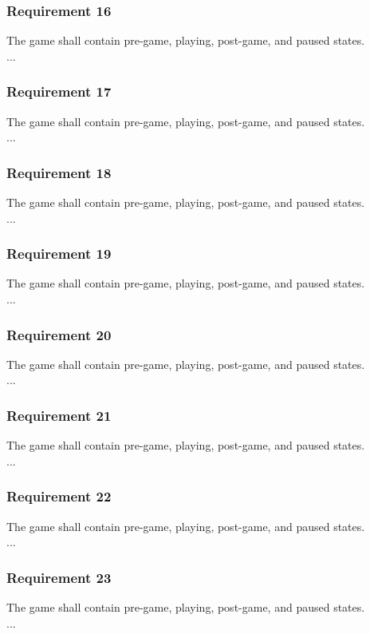 \documentclass[12pt, titlepage]{article}
\begin{document}
\subsubsection{Requirement 16}
The game shall contain pre-game, playing, post-game, and paused states.\\
...\\
\subsubsection{Requirement 17}
The game shall contain pre-game, playing, post-game, and paused states.\\
...\\
\subsubsection{Requirement 18}
The game shall contain pre-game, playing, post-game, and paused states.\\
...\\
\subsubsection{Requirement 19}
The game shall contain pre-game, playing, post-game, and paused states.\\
...\\
\subsubsection{Requirement 20}
The game shall contain pre-game, playing, post-game, and paused states.\\
...\\
\subsubsection{Requirement 21}
The game shall contain pre-game, playing, post-game, and paused states.\\
...\\
\subsubsection{Requirement 22}
The game shall contain pre-game, playing, post-game, and paused states.\\
...\\
\subsubsection{Requirement 23}
The game shall contain pre-game, playing, post-game, and paused states.\\
...\\
\end{document}
